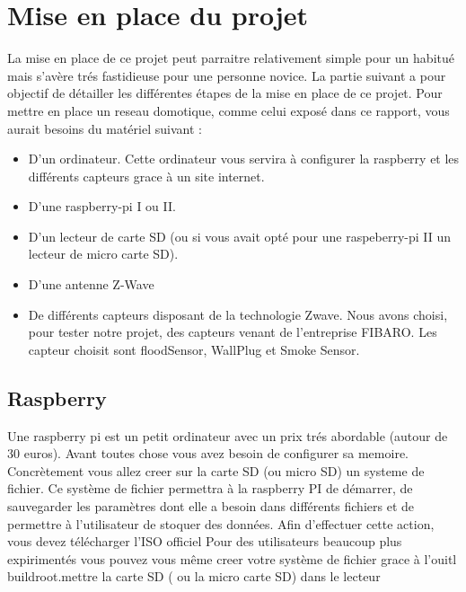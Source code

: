 \chapter{Mise en place du projet}
La mise en place de ce projet peut parraitre relativement simple pour un habitué mais s'avère trés fastidieuse pour une personne novice.
La partie suivant a pour objectif de détailler les différentes étapes de la mise en place de ce projet.
Pour mettre en place un reseau domotique, comme celui exposé dans ce rapport, vous aurait besoins du matériel suivant :

\begin{itemize}
	\item D'un  ordinateur. Cette ordinateur vous servira à configurer la raspberry et  les différents capteurs grace à un site internet.
	\item D'une raspberry-pi I ou II. 
	\item D'un lecteur de carte SD (ou si vous avait opté pour une raspeberry-pi II un lecteur de micro carte SD).
	\item D'une antenne Z-Wave
	\item De différents capteurs disposant de la technologie Zwave. Nous avons choisi, pour tester notre projet, des capteurs venant de l'entreprise FIBARO. Les capteur choisit sont floodSensor, WallPlug et Smoke Sensor.
\end{itemize}

\section{Raspberry}
Une raspberry pi est un petit ordinateur avec un prix trés abordable (autour de 30 euros).
Avant toutes chose vous avez besoin de configurer sa memoire. Concrètement vous allez creer sur la carte SD (ou micro SD) un systeme de fichier.
Ce système de fichier permettra à la raspberry PI de démarrer, de sauvegarder les paramètres dont elle a besoin dans différents fichiers et de permettre à l'utilisateur de stoquer des données.
Afin d'effectuer cette action, vous devez télécharger l'ISO officiel 
Pour des utilisateurs beaucoup plus expirimentés vous pouvez vous même creer votre système de fichier grace à l'ouitl buildroot.mettre la carte SD ( ou la micro carte SD) dans le lecteur 

